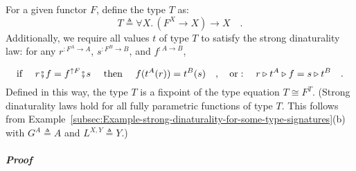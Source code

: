 For a given functor $F$, define the type $T$ as:
\[
T\triangleq\forall X.\,(F^{X}\rightarrow X)\rightarrow X\quad.
\]
Additionally, we require all values $t$ of type $T$ to satisfy the
strong dinaturality law:
for any $r^{:F^{A}\rightarrow A}$, $s^{:F^{B}\rightarrow B}$, and
$f^{:A\rightarrow B}$,

\begin{equation}
\text{if }\quad r\bef f=f^{\uparrow F}\bef s\quad\text{ then }\quad f(t^{A}(r))=t^{B}(s)\quad,\quad\text{or}:\quad r\triangleright t^{A}\triangleright f=s\triangleright t^{B}\quad.\label{eq:strong-dinaturality-for-church-encoded-fix-unfix}
\end{equation}
Defined in this way, the type $T$ is a fixpoint of the type equation
$T\cong F^{T}$. (Strong dinaturality laws hold for all fully parametric
functions of type $T$. This follows from Example~\ref{subsec:Example-strong-dinaturality-for-some-type-signatures}(b)
with $G^{A}\triangleq A$ and $L^{X,Y}\triangleq Y$.)

\subparagraph{Proof}

